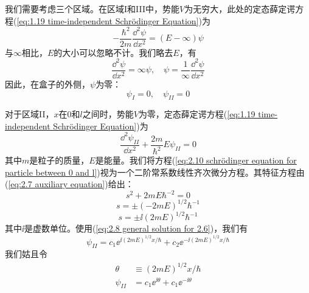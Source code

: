 	我们需要考虑三个区域。在区域I和III中，势能$V$为无穷大，此处的定态薛定谔方程(\ref{eq:1.19 time-independent Schrödinger Equation})为
	\begin{equation*}
		-\frac{\hbar^2}{2m}\frac{\dd ^2\psi}{\dd x^2} = \left(E - \infty\right)\psi
	\end{equation*}
	与$\infty$相比，$E$的大小可以忽略不计。我们略去$E$，有
	\begin{equation*}
		\frac{\dd ^2\psi}{\dd x^2} = \infty \psi, \quad \psi = \frac{1}{\infty}\frac{\dd ^2\psi}{\dd x^2}
	\end{equation*}
	因此，在盒子的外侧，$\psi$为零：
	\begin{equation}
		\psi_I=0, \quad \psi_{II} = 0
		\label{eq:2.9 psi outside the box}
	\end{equation}

	对于区域II，$x$在0和$l$之间时，势能$V$为零，定态薛定谔方程(\ref{eq:1.19 time-independent Schrödinger Equation})为
	\begin{equation}
		\frac{\dd ^2\psi_{II}}{\dd x^2}+\frac{2m}{\hbar^2}E\psi_{II}=0
		\label{eq:2.10 schrödinger equation for particle between 0 and l}
	\end{equation}
	其中$m$是粒子的质量，$E$是能量。我们将方程(\ref{eq:2.10 schrödinger equation for particle between 0 and l})视为一个二阶常系数线性齐次微分方程。其特征方程由(\ref{eq:2.7 auxiliary equation})给出：
	\begin{equation*}
		s^2 + 2mE\hbar^{-2}=0
	\end{equation*}
	\begin{equation}
		s = \pm \left(-2mE\right)^{1/2}\hbar^{-1}
		\label{eq:2.11}
	\end{equation}
	\begin{equation}
		s = \pm \ii \left(2mE\right)^{1/2}\hbar^{-1}
		\label{eq:2.12}
	\end{equation}
	其中$\ii $是虚数单位。使用(\ref{eq:2.8 general solution for 2.6})，我们有
	\begin{equation}
		\psi_{II} = c_1\ee^{\ii \left(2mE\right)^{1/2} x /\hbar}+c_2\ee^{-\ii \left(2mE\right)^{1/2} x /\hbar}
		\label{eq:2.13 general solution for particle between zero and l}
	\end{equation}
	我们姑且令
	\begin{equation*}
		\begin{aligned}
			\theta & \equiv \left(2mE\right)^{1/2} x /\hbar \\
			\psi_{II} & = c_1\ee^{\ii \theta}+c_1\ee^{-\ii \theta}
		\end{aligned}
	\end{equation*}
